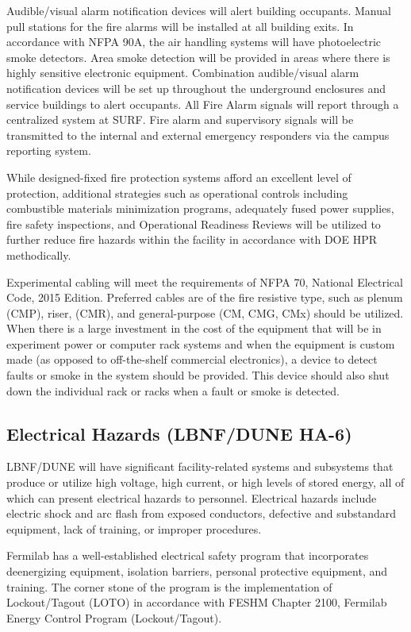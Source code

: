 Audible/visual alarm notification devices will alert building
occupants.  Manual pull stations for the fire alarms will be installed
at all building exits.  In accordance with NFPA 90A, the air handling
systems will have photoelectric smoke detectors.  Area smoke detection
will be provided in areas where there is highly sensitive electronic
equipment.  Combination audible/visual alarm notification devices will
be set up throughout the underground enclosures and service buildings
to alert occupants. All Fire Alarm signals will report through a
centralized system at SURF.  Fire alarm and supervisory signals will
be transmitted to the internal and external emergency responders via
the campus reporting system.

While designed-fixed fire protection systems afford an excellent level
of protection, additional strategies such as operational controls
including combustible materials minimization programs, adequately
fused power supplies, fire safety inspections, and Operational
Readiness Reviews will be utilized to further reduce fire hazards
within the facility in accordance with DOE HPR methodically.

Experimental cabling will meet the requirements of NFPA 70, National
Electrical Code, 2015 Edition.  Preferred cables are of the fire
resistive type, such as plenum (CMP), riser, (CMR), and
general-purpose (CM, CMG, CMx) should be utilized.  When there is a
large investment in the cost of the equipment that will be in
experiment power or computer rack systems and when the equipment is
custom made (as opposed to off-the-shelf commercial electronics), a
device to detect faults or smoke in the system should be provided.
This device should also shut down the individual rack or racks when a
fault or smoke is detected.


\subsection{Electrical Hazards (LBNF/DUNE HA-6)}

LBNF/DUNE will have significant facility-related systems and
subsystems that produce or utilize high voltage, high current, or high
levels of stored energy, all of which can present electrical hazards
to personnel. Electrical hazards include electric shock and arc flash
from exposed conductors, defective and substandard equipment, lack of
training, or improper procedures.

Fermilab has a well-established electrical safety program that
incorporates deenergizing equipment, isolation barriers, personal
protective equipment, and training. The corner stone of the program is
the implementation of Lockout/Tagout (LOTO) in accordance with FESHM
Chapter 2100, Fermilab Energy Control Program (Lockout/Tagout).

